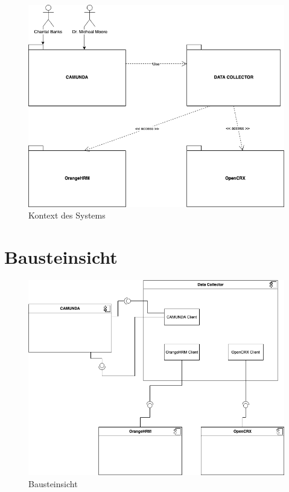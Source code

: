 \documentclass[]{article}
\begin{document}
\begin{figure}[H]
	\centering
	\includegraphics[width=1.0\linewidth]{"images/uebung6_4_kontext_sicht"}
	\caption{Kontext des Systems}
	\label{fig:uebung64kontextsicht}
\end{figure}

\hypertarget{section-building-block-view}{%
\section{Bausteinsicht}\label{section-building-block-view}}

\begin{figure}[H]
	\centering
	\includegraphics[width=1.0\linewidth]{"images/uebung6_4_baustein_sicht"}
	\caption{Bausteinsicht}
	\label{fig:uebung64bausteinsicht}
\end{figure}
\end{document}
